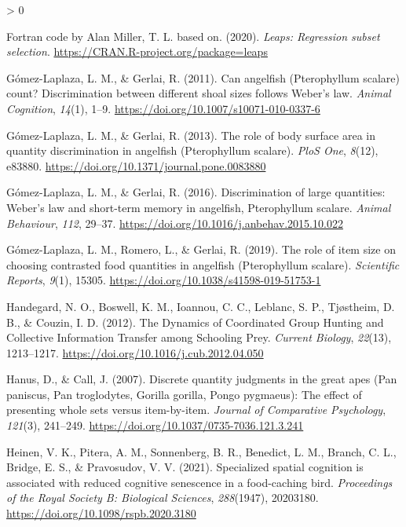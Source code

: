 \documentclass[
  english,
  ,doc,floatsintext]{apa6}
\newlength{\cslhangindent}
\newenvironment{CSLReferences}[2] %
 {%
  \setlength{\parindent}{0pt}
  \ifodd #1 \everypar{\setlength{\hangindent}{\cslhangindent}}\ignorespaces\fi
  \ifnum #2 > 0
  \setlength{\parskip}{#2\baselineskip}
  \fi
 }%
 {}
\begin{document}
\begin{CSLReferences}{1}{0}
\leavevmode\hypertarget{ref-R-leaps}{}%
Fortran code by Alan Miller, T. L. based on. (2020). \emph{Leaps: Regression subset selection}. \url{https://CRAN.R-project.org/package=leaps}

\leavevmode\hypertarget{ref-Gomez-Laplaza.Gerlai.2011}{}%
Gómez-Laplaza, L. M., \& Gerlai, R. (2011). Can angelfish ({Pterophyllum} scalare) count? {Discrimination} between different shoal sizes follows {Weber}'s law. \emph{Animal Cognition}, \emph{14}(1), 1--9. \url{https://doi.org/10.1007/s10071-010-0337-6}

\leavevmode\hypertarget{ref-Gomez-Laplaza.Gerlai.2013}{}%
Gómez-Laplaza, L. M., \& Gerlai, R. (2013). The role of body surface area in quantity discrimination in angelfish ({Pterophyllum} scalare). \emph{PloS One}, \emph{8}(12), e83880. \url{https://doi.org/10.1371/journal.pone.0083880}

\leavevmode\hypertarget{ref-Gomez-Laplaza.Gerlai.2016}{}%
Gómez-Laplaza, L. M., \& Gerlai, R. (2016). Discrimination of large quantities: {Weber}'s law and short-term memory in angelfish, {Pterophyllum} scalare. \emph{Animal Behaviour}, \emph{112}, 29--37. \url{https://doi.org/10.1016/j.anbehav.2015.10.022}

\leavevmode\hypertarget{ref-Gomez-Laplaza.etal.2019}{}%
Gómez-Laplaza, L. M., Romero, L., \& Gerlai, R. (2019). The role of item size on choosing contrasted food quantities in angelfish ({Pterophyllum} scalare). \emph{Scientific Reports}, \emph{9}(1), 15305. \url{https://doi.org/10.1038/s41598-019-51753-1}

\leavevmode\hypertarget{ref-Handegard.etal.2012}{}%
Handegard, N. O., Boswell, K. M., Ioannou, C. C., Leblanc, S. P., Tjøstheim, D. B., \& Couzin, I. D. (2012). The {Dynamics} of {Coordinated} {Group} {Hunting} and {Collective} {Information} {Transfer} among {Schooling} {Prey}. \emph{Current Biology}, \emph{22}(13), 1213--1217. \url{https://doi.org/10.1016/j.cub.2012.04.050}

\leavevmode\hypertarget{ref-Hanus.Call.2007}{}%
Hanus, D., \& Call, J. (2007). Discrete quantity judgments in the great apes ({Pan} paniscus, {Pan} troglodytes, {Gorilla} gorilla, {Pongo} pygmaeus): {The} effect of presenting whole sets versus item-by-item. \emph{Journal of Comparative Psychology}, \emph{121}(3), 241--249. \url{https://doi.org/10.1037/0735-7036.121.3.241}

\leavevmode\hypertarget{ref-Heinen.etal.2021}{}%
Heinen, V. K., Pitera, A. M., Sonnenberg, B. R., Benedict, L. M., Branch, C. L., Bridge, E. S., \& Pravosudov, V. V. (2021). Specialized spatial cognition is associated with reduced cognitive senescence in a food-caching bird. \emph{Proceedings of the Royal Society B: Biological Sciences}, \emph{288}(1947), 20203180. \url{https://doi.org/10.1098/rspb.2020.3180}


\end{CSLReferences}
\end{document}
